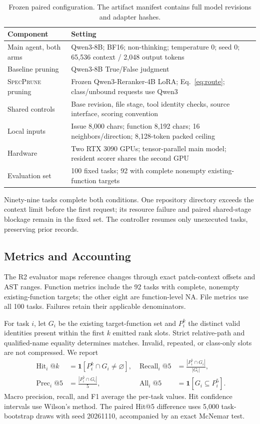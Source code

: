 \documentclass{svproc}
\newcommand{\specprune}{\textsc{SpecPrune}}
\newcommand{\hit}{\operatorname{Hit}}
\newcommand{\rec}{\operatorname{Recall}}
\begin{document}
\begin{table}[t]
\caption{Frozen paired configuration. The artifact manifest contains full model revisions and adapter hashes.}
\label{tab:configuration}
\centering\small
\begin{tabular}{@{}p{}p{}@{}}
\toprule
Component & Setting \\
\midrule
Main agent, both arms & Qwen3-8B; BF16; non-thinking; temperature 0; seed 0; 65,536 context / 2,048 output tokens \\
Baseline pruning & Qwen3-8B True/False judgment \\
\specprune{} pruning & Frozen Qwen3-Reranker-4B LoRA; Eq.~\ref{eq:route}; class/unbound requests use Qwen3 \\
Shared controls & Base revision, file stage, tool identity checks, source interface, scoring convention \\
Local inputs & Issue 8,000 chars; function 8,192 chars; 16 neighbors/direction; 8,128-token packed ceiling \\
Hardware & Two RTX 3090 GPUs; tensor-parallel main model; resident scorer shares the second GPU \\
Evaluation set & 100 fixed tasks; 92 with complete nonempty existing-function targets \\
\bottomrule
\end{tabular}
\end{table}

Ninety-nine tasks complete both conditions. One repository directory exceeds the context limit before the first request; its resource failure and paired shared-stage blockage remain in the fixed set. The controller resumes only unexecuted tasks, preserving prior records.

\subsection{Metrics and Accounting}
The R2 evaluator maps reference changes through exact patch-context offsets and AST ranges. Function metrics include the 92 tasks with complete, nonempty existing-function targets; the other eight are function-level NA. File metrics use all 100 tasks. Failures retain their applicable denominators.

For task $i$, let $G_i$ be the existing target-function set and $P_i^k$ the distinct valid identities present within the first $k$ emitted rank slots. Strict relative-path and qualified-name equality determines matches. Invalid, repeated, or class-only slots are not compressed. We report
\begin{align}
 \hit_i@k&=\mathbf{1}[P_i^k\cap G_i\ne\varnothing], &
 \rec_i@5&=\frac{|P_i^5\cap G_i|}{|G_i|},\\
 \operatorname{Prec}_i@5&=\frac{|P_i^5\cap G_i|}{5}, &
 \operatorname{All}_i@5&=\mathbf{1}[G_i\subseteq P_i^5].
\end{align}
Macro precision, recall, and F1 average the per-task values. Hit confidence intervals use Wilson's method. The paired Hit@5 difference uses 5,000 task-bootstrap draws with seed 20261110, accompanied by an exact McNemar test.
\end{document}
